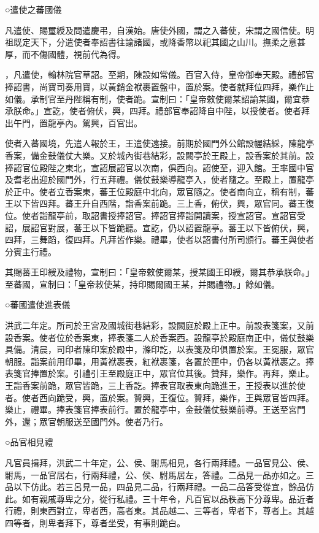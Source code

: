 ○遣使之蕃國儀

凡遣使、賜璽綬及問遣慶弔，自漢始。唐使外國，謂之入蕃使，宋謂之國信使。明祖既定天下，分遣使者奉詔書往諭諸國，或降香幣以祀其國之山川。撫柔之意甚厚，而不傷國體，視前代為得。

，凡遣使，翰林院官草詔。至期，陳設如常儀。百官入侍，皇帝御奉天殿。禮部官捧詔書，尚寶司奏用寶，以黃銷金袱裹置盤中，置於案。使者就拜位四拜，樂作止如儀。承制官至丹陛稱有制，使者跪。宣制曰：「皇帝敕使爾某詔諭某國，爾宜恭承朕命。」宣訖，使者俯伏，興，四拜。禮部官奉詔降自中陛，以授使者。使者拜出午門，置龍亭內。駕興，百官出。

使者入蕃國境，先遣人報於王，王遣使遠接。前期於國門外公館設幄結綵，陳龍亭香案，備金鼓儀仗大樂。又於城內街巷結彩，設闕亭於王殿上，設香案於其前。設捧詔官位殿陛之東北，宣詔展詔官以次南，俱西向。詔使至，迎入館。王率國中官及耆老出迎於國門外，行五拜禮。儀仗鼓樂導龍亭入，使者隨之。至殿上，置龍亭於正中。使者立香案東，蕃王位殿庭中北向，眾官隨之。使者南向立，稱有制，蕃王以下皆四拜。蕃王升自西階，詣香案前跪。三上香，俯伏，興，眾官同。蕃王復位。使者詣龍亭前，取詔書授捧詔官。捧詔官捧詣開讀案，授宣詔官。宣詔官受詔，展詔官對展，蕃王以下皆跪聽。宣訖，仍以詔置龍亭。蕃王以下皆俯伏，興，四拜，三舞蹈，復四拜。凡拜皆作樂。禮畢，使者以詔書付所司頒行。蕃王與使者分賓主行禮。

其賜蕃王印綬及禮物，宣制曰：「皇帝敕使爾某，授某國王印綬，爾其恭承朕命。」至蕃國，宣制曰：「皇帝敕使某，持印賜爾國王某，并賜禮物。」餘如儀。

○蕃國遣使進表儀

洪武二年定。所司於王宮及國城街巷結彩，設闕庭於殿上正中。前設表箋案，又前設香案。使者位於香案東，捧表箋二人於香案西。設龍亭於殿庭南正中，儀仗鼓樂具備。清晨，司印者陳印案於殿中，滌印訖，以表箋及印俱置於案。王冕服，眾官朝服。詣案前用印畢，用黃袱裹表，紅袱裹箋，各置於匣中，仍各以黃袱裹之。捧表箋官捧置於案。引禮引王至殿庭正中，眾官位其後。贊拜，樂作。再拜，樂止。王詣香案前跪，眾官皆跪，三上香訖。捧表官取表東向跪進王，王授表以進於使者。使者西向跪受，興，置於案。贊興，王復位。贊拜，樂作，王與眾官皆四拜。樂止，禮畢。捧表箋官捧表前行。置於龍亭中，金鼓儀仗鼓樂前導。王送至宮門外，還；眾官朝服送至國門外。使者乃行。

○品官相見禮

凡官員揖拜，洪武二十年定，公、侯、駙馬相見，各行兩拜禮。一品官見公、侯、駙馬，一品官居右，行兩拜禮，公、侯、駙馬居左，答禮。二品見一品亦如之。三品以下仿此。若三呂見一品，四品見二品，行兩拜禮。一品二品答受從宜，餘品仿此。如有親戚尊卑之分，從行私禮。三十年令，凡百官以品秩高下分尊卑。品近者行禮，則東西對立，卑者西，高者東。其品越二、三等者，卑者下，尊者上。其越四等者，則卑者拜下，尊者坐受，有事則跪白。

